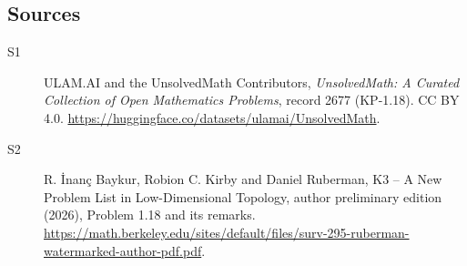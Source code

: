 \documentclass[11pt]{article}
\begin{document}
\subsection{Sources}
\begin{description}
\item[\hypertarget{source:2677:1}{S1}] ULAM.AI and the UnsolvedMath Contributors, \emph{UnsolvedMath: A Curated Collection of Open Mathematics Problems}, record 2677 (KP-1.18). CC BY 4.0. \url{https://huggingface.co/datasets/ulamai/UnsolvedMath}.
\item[\hypertarget{source:2677:2}{S2}] R. \.{I}nan\c{c} Baykur, Robion C. Kirby and Daniel Ruberman, K3 -- A New Problem List in Low-Dimensional Topology, author preliminary edition (2026), Problem 1.18 and its remarks. \url{https://math.berkeley.edu/sites/default/files/surv-295-ruberman-watermarked-author-pdf.pdf}.
\end{description}
\label{end:2677}
\end{document}
